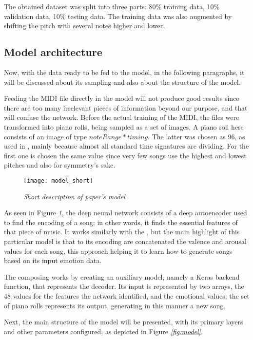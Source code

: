 The obtained dataset was split into three parts: 80\% training data,
10\% validation data, 10\% testing data.
The training data was also augmented by shifting the pitch with several notes higher and lower.

\subsection{Model architecture}
Now, with the data ready to be fed to the model,
in the following paragraphs,
it will be discussed about its sampling and also about the structure of the model.

Feeding the MIDI file directly in the model
will not produce good results since there are too many irrelevant pieces of information
beyond our purpose, and that will confuse the network.
Before the actual training of the MIDI,
the files were transformed into piano rolls,
being sampled as a set of images.
A piano roll here consists of an image of type $noteRange * timing$.
The latter was chosen as 96, as used in \cite{hackerPoet},
mainly because almost all standard time signatures are dividing.
For the first one is chosen the same value since very few songs use the highest
and lowest pitches and also for symmetry's sake.

\begin{figure}[h]
      \centering
      \texttt{[image: model\_short]}
      \caption{\emph{Short description of paper's model}}
      \label{fig:model_short}
\end{figure}

As seen in Figure \emph{\ref{fig:model_short}},
the deep neural network consists of a deep autoencoder used to find the encoding of a song;
in other words, it finds the essential features of that piece of music.
It works similarly with the \cite{hackerPoet},
but the main highlight of this particular model is that to its encoding
are concatenated the valence and arousal values for each song,
this approach helping it to learn how to generate songs based on its input emotion data.

The composing works by creating an auxiliary model,
namely a Keras backend function,
that represents the decoder.
Its input is represented by two arrays,
the 48 values for the features the network identified,
and the emotional values; the set of piano rolls represents its output,
generating in this manner a new song.

Next, the main structure of the model will be presented,
with its primary layers and other parameters configured, as depicted in Figure \emph{\ref{fig:model}}.


